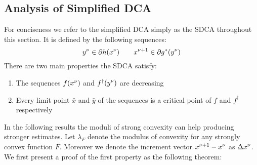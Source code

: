 \subsection{Analysis of Simplified DCA}
For conciseness we refer to the simplified DCA simply as the SDCA throughout
this section. It is defined by the following sequences:
\begin{equation}
	y^{\nu}\in\partial h(x^\nu) \qquad x^{\nu+1}\in\partial g^*(y^{\nu})
\end{equation}
There are two main properties the SDCA satisfy:
\begin{enumerate}
    \item The sequences $f(x^\nu)$ and $f^\dagger (y^{\nu})$ are decreasing
    \item Every limit point $\bar x$ and $\bar y$ of the sequences is a
	critical point of $f$ and $f^\dagger$ respectively
\end{enumerate}
In the following results the moduli of strong convexity can help
producing stronger estimates. Let $\lambda_F$ denote the modulus of
convexity for any strongly convex function $F$. Moreover we denote 
the increment vector $x^{\nu+1}-x^\nu$ as $\Delta x^\nu$.
We first present a proof of the first property as the following theorem:

